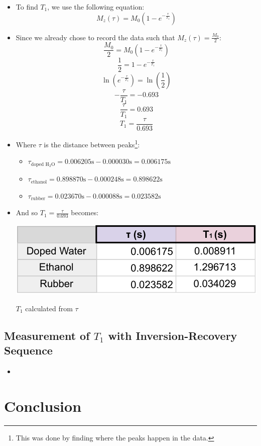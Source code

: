 \documentclass{article}
\begin{document}
\begin{itemize}
    \item To find $T_1$, we use the following equation:
    \[ M_z(\tau) = M_0 \left( 1 - e^{-\frac{\tau}{T_1}} \right) \]
    \item Since we already chose to record the data such that $M_z(\tau) = \frac{M_0}{2}$:
    \[ \frac{M_0}{2} = M_0 \left( 1 - e^{-\frac{\tau}{T_1}} \right) \]
    \[ \frac{1}{2} = 1 - e^{-\frac{\tau}{T_1}} \]
    \[ \ln \left( e^{-\frac{\tau}{T_1}} \right) = \ln \left( \frac{1}{2} \right) \]
    \[ -\frac{\tau}{T_1} = -0.693 \]
    \[ \frac{\tau}{T_1} = 0.693 \]
    \[ T_1 = \frac{\tau}{0.693} \]
    \item Where $\tau$ is the distance between peaks\footnote{This was done by finding where the peaks happen in the data.}:
    \begin{itemize}
        \item $\tau_{\text{doped H$_2$O}} = 0.006205\text{s} - 0.000030\text{s} = 0.006175\text{s}$
        \item $\tau_{\text{ethanol}} = 0.898870\text{s} - 0.000248\text{s} = 0.898622\text{s}$
        \item $\tau_{\text{rubber}} = 0.023670\text{s} - 0.000088\text{s} = 0.023582\text{s}$
    \end{itemize}
    \item And so $T_1 = \frac{\tau}{0.693}$ becomes:
    \begin{table}[h]
        \centering
        \includegraphics[scale = 0.78]{../images/B3_T1-crop}
        \caption{$T_1$ calculated from $\tau$}
        \label{tab:T1_table}
    \end{table}
\end{itemize}

\subsection{Measurement of $T_1$ with Inversion-Recovery Sequence}\label{subsec:measurement-of-$t_1$-with-inversion-recovery-sequence}
\begin{itemize}
    \item
\end{itemize}

\newpage

\section{Conclusion}\label{sec:conclusion}
\end{document}

